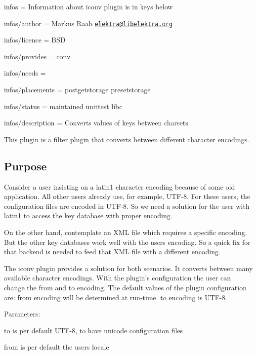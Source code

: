
\begin{DoxyItemize}
\item infos = Information about iconv plugin is in keys below
\item infos/author = Markus Raab \href{mailto:elektra@libelektra.org}{\tt elektra@libelektra.\+org}
\item infos/licence = B\+SD
\item infos/provides = conv
\item infos/needs =
\item infos/placements = postgetstorage presetstorage
\item infos/status = maintained unittest libc
\item infos/description = Converts values of keys between charsets
\end{DoxyItemize}

This plugin is a filter plugin that converts between different character encodings.

\subsection*{Purpose}

Consider a user insisting on a {\ttfamily latin1} character encoding because of some old application. All other users already use, for example, {\ttfamily U\+T\+F-\/8}. For these users, the configuration files are encoded in {\ttfamily U\+T\+F-\/8}. So we need a solution for the user with {\ttfamily latin1} to access the key database with proper encoding.

On the other hand, contemplate an X\+ML file which requires a specific encoding. But the other key databases work well with the users encoding. So a quick fix for that backend is needed to feed that X\+ML file with a different encoding.

The iconv plugin provides a solution for both scenarios. It converts between many available character encodings. With the plugin’s configuration the user can change the from and to encoding. The default values of the plugin configuration are\+: {\ttfamily from} encoding will be determined at run-\/time. {\ttfamily to} encoding is {\ttfamily U\+T\+F-\/8}.

Parameters\+:
\begin{DoxyItemize}
\item {\ttfamily to} is per default U\+T\+F-\/8, to have unicode configuration files
\item {\ttfamily from} is per default the users locale
\end{DoxyItemize}

